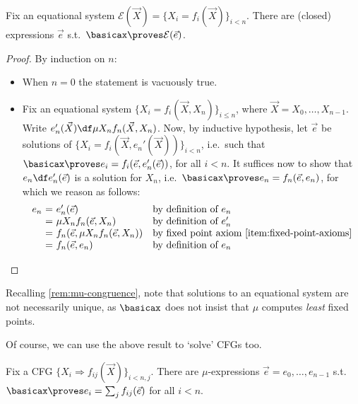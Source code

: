 \begin{proposition}
\label{eq-systems-have-solns-in-basicax}
    Fix an equational system $\mathcal E(\vec X) = \{X_i = f_i(\vec X)\}_{i<n}$. 
    There are (closed) expressions $\vec e $ s.t.\ $\basicax \proves \mathcal E(\vec e)$. 
\end{proposition}
\begin{proof}
    By induction on $n$:
    \begin{itemize}
        \item When $n=0$ the statement is vacuously true.
        \item Fix an equational system $\{X_i = f_i(\vec X, X_n)\}_{i\leq n}$, where $\vec X = X_0, \dots, X_{n-1}$.
        Write $e_n'(\vec X) \df \mu X_n f_n (\vec X, X_n)$.
        Now, by inductive hypothesis, let $\vec e$ be solutions of $\{X_i = f_i(\vec X, e_n'(\vec X))\}_{i<n}$, i.e.\ such that $\basicax \proves e_i = f_i(\vec e, e_n'(\vec e))$, for all $i<n$.
        It suffices now to show that $e_n \df e_n'(\vec e) $ is a solution for $X_n$, i.e.\ $\basicax \proves e_n = f_n (\vec e, e_n)$, for which we reason as follows:
        \[
        \begin{array}{r@{\ = \ }ll}
             e_n & e_n' (\vec e) & \text{by definition of $e_n$} \\
                & \mu X_n f_n (\vec e, X_n) & \text{by definition of $e_n'$} \\
                & f_n (\vec e, \mu X_n f_n (\vec e, X_n)) & \text{by fixed point axiom \eqref{item:fixed-point-axioms}} \\
                & f_n (\vec e, e_n) & \text{by definition of $e_n$} \qedhere
        \end{array}
        \]
    \end{itemize}
\end{proof}

Recalling \cref{rem:mu-congruence}, note that solutions to an equational system are not necessarily unique, as $\basicax$ does not insist that $\mu$ computes \emph{least} fixed points.

Of course, we can use the above result to `solve' CFGs too.

\begin{corollary}
\label{cfgs-have-solutions-in-basicaxs}
    Fix a CFG $\{X_i \Rightarrow f_{ij} (\vec X)\}_{i<n, j}$.
    There are $\mu$-expressions $\vec e = e_0, \dots, e_{n-1}$ s.t.\ $\basicax \proves e_i = \sum_j f_{ij} ({\vec e})$ for all $i<n$.
\end{corollary}

